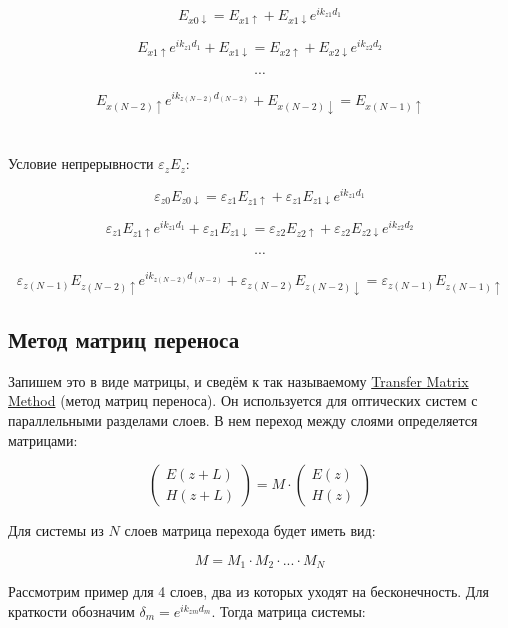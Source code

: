 \documentclass{article}
\begin{document}
$$
E_{x0\downarrow} = E_{x1\uparrow} + E_{x1\downarrow} e^{i k_{z1} d_1}
$$

$$
E_{x1\uparrow} e^{i k_{z1} d_1} + E_{x1\downarrow} = E_{x2\uparrow} + E_{x2\downarrow} e^{i k_{z2} d_2}
$$

$$
\cdots
$$

$$
E_{x(N-2)\uparrow} e^{i k_{z(N-2)} d_{(N-2)}} + E_{x(N-2)\downarrow} = E_{x(N-1)\uparrow}
$$
\\
\\
Условие непрерывности $\varepsilon_z E_z$:

$$
\varepsilon_{z0} E_{z0\downarrow} = \varepsilon_{z1} E_{z1\uparrow} + \varepsilon_{z1} E_{z1\downarrow} e^{i k_{z1} d_1}
$$

$$
\varepsilon_{z1} E_{z1\uparrow} e^{i k_{z1} d_1} + \varepsilon_{z1} E_{z1\downarrow} = \varepsilon_{z2} E_{z2\uparrow} + \varepsilon_{z2} E_{z2\downarrow} e^{i k_{z2} d_2}
$$

$$
\cdots
$$

$$
\varepsilon_{z(N-1)} E_{z(N-2)\uparrow} e^{i k_{z(N-2)} d_{(N-2)}} + \varepsilon_{z(N-2)} E_{z(N-2)\downarrow} = \varepsilon_{z(N-1)} E_{z(N-1)\uparrow}
$$

\subsection{Метод матриц переноса}
Запишем это в виде матрицы, и сведём к так называемому  \href{https://en.wikipedia.org/wiki/Transfer-matrix_method_ (optics)}{Transfer Matrix Method} (метод матриц переноса). Он используется для оптических систем с параллельными разделами слоев. В нем переход между слоями определяется матрицами:

\[
\left( \begin{array}{c}
E(z+L) \\
H(z+L)
\end{array} \right)
= M \cdot
\left( \begin{array}{c}
E(z) \\
H(z)
\end{array} \right)
\]

Для системы из $N$ слоев матрица перехода будет иметь вид:

$$
M = M_1 \cdot M_2 \cdot ... \cdot M_N
$$

Рассмотрим пример для 4 слоев, два из которых уходят на бесконечность. Для краткости обозначим $\delta_m = e^{i k_{zm} d_m}$. Тогда матрица системы:
\end{document}
